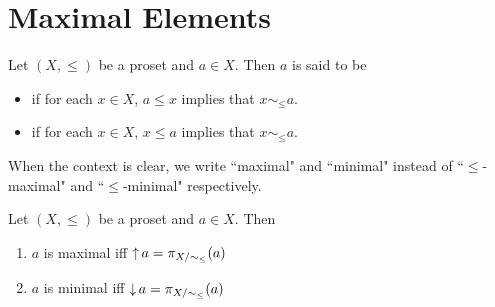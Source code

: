 \documentclass{book}
\begin{document}
	
	
	
	
	
	
	
	
	
	
	
	
	
	
	
	
	
	
	
	\section{Maximal Elements}
	
	\begin{defn} 
		Let $(X, \leq)$ be a proset and $a \in X$. Then $a$ is said to be
		\begin{itemize}
			\item {} if for each $x \in X$, $a \leq x$ implies that $x \sim_{\leq} a$.  
			\item {} if for each $x \in X$, $x \leq a$ implies that $x \sim_{\leq} a$. 
		\end{itemize} 
	\end{defn}
	
	\begin{note}
		When the context is clear, we write ``maximal" and ``minimal" instead of ``$\leq$-maximal" and ``$\leq$-minimal" respectively. 
	\end{note}
	
	\begin{ex} 
		Let $(X, \leq)$ be a proset and $a \in X$. Then 
		\begin{enumerate}
			\item $a$ is maximal iff $\operatorname{\uparrow} a = \pi_{X/\sim_{\leq}}(a)$
			\item $a$ is minimal iff $\operatorname{\downarrow} a = \pi_{X/\sim_{\leq}}(a)$
		\end{enumerate}
	\end{ex}
	
\end{document}
